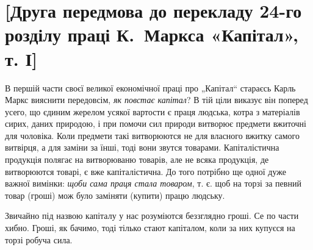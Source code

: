 \section*{[Друга передмова до перекладу 24-го розділу праці К.~Маркса «Капітал», т. І]\protect\footnotemarkZ{}}


\noindent{}В першій части своєї великої економічної праці про „Капітал“ стараєсь Карль Маркс вияснити передовсім, \emph{як повстає капітал}? В тій ціли виказує він поперед усего, що єдиним жерелом усякої вартости є праця людська, котра з матеріалів сирих, даних природою, і при помочи сил природи витворює предмети вжиточні для чоловіка. Коли предмети такі витворюются не для власного вжитку самого витвірця, а для заміни за їнші, тоді вони звутся товарами. Капіталістична продукція полягає на витворюваню товарів, але не всяка продукція, де витворюются товарі, є вже капіталістична. До того потрібно ще одної дуже важної вимінки: \emph{щоби сама праця стала товаром}, т. є. щоб на торзі за певний товар (гроші) мож було заміняти (купити) працю людську.

Звичайно під назвою капіталу у нас розуміются беззглядно гроші. Се по части хибно. Гроші, як бачимо, тоді тілько стают капіталом, коли за них купуєся на торзі робуча сила.

